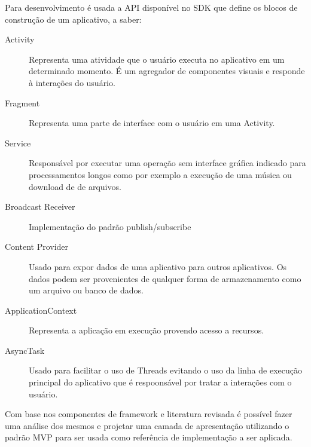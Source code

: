 Para desenvolvimento é usada a API disponível no SDK que define
os blocos de construção de um aplicativo, a saber:

\begin{description}
  \item[Activity] Representa uma atividade que o usuário executa no aplicativo
  em um determinado momento. É um agregador de componentes visuais e responde à
  interações do usuário.
  \item[Fragment] Representa uma parte de interface com o usuário em uma
  Activity.
  \item[Service] Responsável por executar uma operação sem interface gráfica
  indicado para processamentos longos como por exemplo a execução de uma música
  ou download de de arquivos.
  \item[Broadcast Receiver] Implementação do padrão publish/subscribe 
  \item[Content Provider] Usado para expor dados de uma aplicativo para outros
  aplicativos. Os dados podem ser provenientes de qualquer forma de
  armazenamento como um arquivo ou banco de dados.
  \item[ApplicationContext] Representa a aplicação em execução provendo acesso
  a recursos.
  \item[AsyncTask] Usado para facilitar o uso de Threads evitando o uso
  da linha de execução principal do aplicativo que é respoonsável por tratar a
  interações com o usuário.
\end{description}

Com base nos componentes de framework e literatura revisada é possível fazer
uma análise dos mesmos e projetar uma camada de apresentação utilizando o padrão
MVP para ser usada como referência de implementação a ser aplicada.